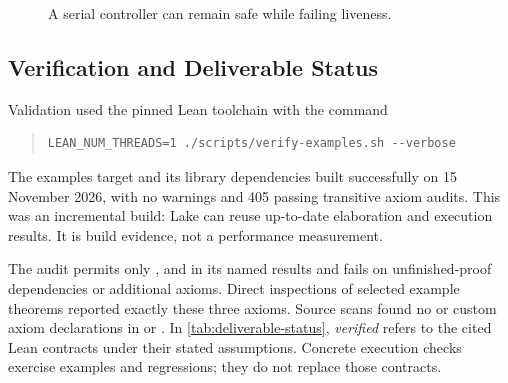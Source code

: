 \begin{figure}[!ht]
  \centering
  \resizebox{\linewidth}{!}{}
  \caption{A serial controller can remain safe while failing liveness.}
  \label{fig:example-traffic}
\end{figure}

\clearpage
\subsection{Verification and Deliverable Status}

Validation used the pinned Lean toolchain with the command
\begin{quote}\small
\begin{verbatim}
LEAN_NUM_THREADS=1 ./scripts/verify-examples.sh --verbose
\end{verbatim}
\end{quote}
The examples target and its library dependencies built successfully on
15 November 2026, with no warnings and 405 passing transitive axiom audits.
This was an incremental build: Lake can reuse up-to-date elaboration and
execution results. It is build evidence, not a performance measurement.

The audit permits only ,  and
 in its named results and fails on unfinished-proof
dependencies or additional axioms. Direct inspections of selected example
theorems reported exactly these three axioms. Source scans found no  or
custom axiom declarations in  or .
In \cref{tab:deliverable-status}, \emph{verified} refers to the cited Lean
contracts under their stated assumptions. Concrete execution checks
exercise examples and regressions; they do not replace those contracts.

